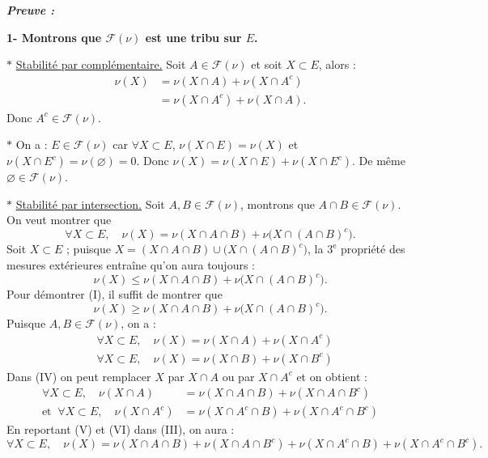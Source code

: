 \documentclass[11pt,a4paper]{article}
\newcommand{\Ff}{\mathscr{F}}
\newenvironment{preuve}{\par\textit{\textbf{Preuve :}}\par\nopagebreak[4]}{\par}
\begin{document}
\begin{preuve}
\textbf{1- Montrons que $\Ff(\nu)$ est une tribu sur $E$.}

$\ast$ \underline{Stabilité par complémentaire.} Soit $A\in\Ff(\nu)$ et soit $X\subset E$, alors :
\begin{align*}
  \nu(X)&=\nu(X\cap A)+\nu(X\cap A^c)\\
        &=\nu(X\cap A^c)+\nu(X\cap A).
\end{align*}
Donc $A^c\in\Ff(\nu)$.

$\ast$ On a : $E\in\Ff(\nu)$ car $\forall X\subset E$, $\nu(X\cap E)=\nu(X)$ et $\nu(X\cap E^c)=\nu(\varnothing)=0$.
Donc $\nu(X)=\nu(X\cap E)+\nu(X\cap E^c)$. De même $\varnothing\in\Ff(\nu)$.

$\ast$ \underline{Stabilité par intersection.}
Soit $A,B\in\Ff(\nu)$, montrons que $A\cap B\in\Ff(\nu)$. On veut montrer que
\begin{equation*}
  \forall X\subset E,\quad \nu(X)=\nu(X\cap A\cap B)+\nu\bigl(X\cap(A\cap B)^c\bigr).\tag{I}
\end{equation*}
Soit $X\subset E$ ; puisque $X=(X\cap A\cap B)\cup\bigl(X\cap(A\cap B)^c\bigr)$, la $3^{\text{e}}$ propriété des mesures extérieures entraîne
qu'on aura toujours :
\[
  \nu(X)\le\nu(X\cap A\cap B)+\nu\bigl(X\cap(A\cap B)^c\bigr).
\]
Pour démontrer (I), il suffit de montrer que
\begin{equation*}
  \nu(X)\ge\nu(X\cap A\cap B)+\nu\bigl(X\cap(A\cap B)^c\bigr).\tag{II}
\end{equation*}
Puisque $A,B\in\Ff(\nu)$, on a :
\begin{align*}
  &\forall X\subset E,\quad \nu(X)=\nu(X\cap A)+\nu(X\cap A^c)\tag{III}\\
  &\forall X\subset E,\quad \nu(X)=\nu(X\cap B)+\nu(X\cap B^c)\tag{IV}
\end{align*}
Dans (IV) on peut remplacer $X$ par $X\cap A$ ou par $X\cap A^c$ et on obtient :
\begin{align*}
  \forall X\subset E,\quad \nu(X\cap A)&=\nu(X\cap A\cap B)+\nu(X\cap A\cap B^c)\tag{V}\\
  \text{et }\ \forall X\subset E,\quad \nu(X\cap A^c)&=\nu(X\cap A^c\cap B)+\nu(X\cap A^c\cap B^c)\tag{VI}
\end{align*}
En reportant (V) et (VI) dans (III), on aura :
\begin{equation*}
  \forall X\subset E,\quad \nu(X)=\nu(X\cap A\cap B)+\nu(X\cap A\cap B^c)+\nu(X\cap A^c\cap B)+\nu(X\cap A^c\cap B^c).\tag{VII}
\end{equation*}


\end{preuve}
\end{document}
